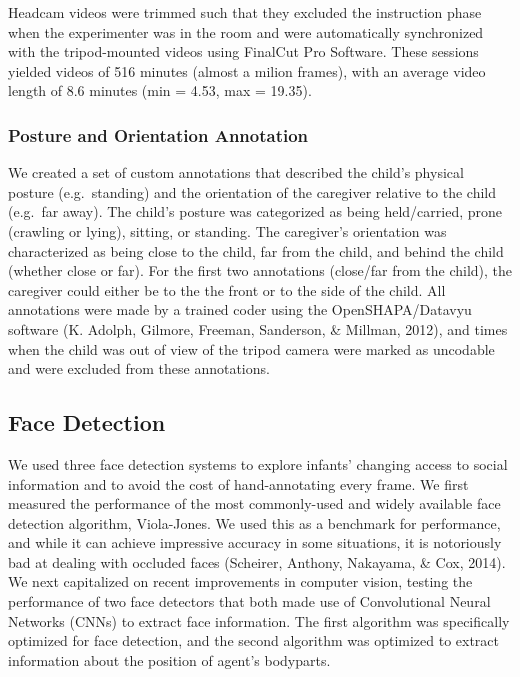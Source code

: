 \documentclass[10pt, letterpaper]{article}
\begin{document}
Headcam videos were trimmed such that they excluded the instruction
phase when the experimenter was in the room and were automatically
synchronized with the tripod-mounted videos using FinalCut Pro Software.
These sessions yielded videos of 516 minutes (almost a milion frames),
with an average video length of 8.6 minutes (min = 4.53, max = 19.35).

\subsubsection{Posture and Orientation
Annotation}\label{posture-and-orientation-annotation}

We created a set of custom annotations that described the child's
physical posture (e.g.~standing) and the orientation of the caregiver
relative to the child (e.g.~far away). The child's posture was
categorized as being held/carried, prone (crawling or lying), sitting,
or standing. The caregiver's orientation was characterized as being
close to the child, far from the child, and behind the child (whether
close or far). For the first two annotations (close/far from the child),
the caregiver could either be to the the front or to the side of the
child. All annotations were made by a trained coder using the
OpenSHAPA/Datavyu software (K. Adolph, Gilmore, Freeman, Sanderson, \&
Millman, 2012), and times when the child was out of view of the tripod
camera were marked as uncodable and were excluded from these
annotations.

\subsection{Face Detection}\label{face-detection}

We used three face detection systems to explore infants' changing access
to social information and to avoid the cost of hand-annotating every
frame. We first measured the performance of the most commonly-used and
widely available face detection algorithm, Viola-Jones. We used this as
a benchmark for performance, and while it can achieve impressive
accuracy in some situations, it is notoriously bad at dealing with
occluded faces (Scheirer, Anthony, Nakayama, \& Cox, 2014). We next
capitalized on recent improvements in computer vision, testing the
performance of two face detectors that both made use of Convolutional
Neural Networks (CNNs) to extract face information. The first algorithm
was specifically optimized for face detection, and the second algorithm
was optimized to extract information about the position of agent's
bodyparts.
\end{document}
